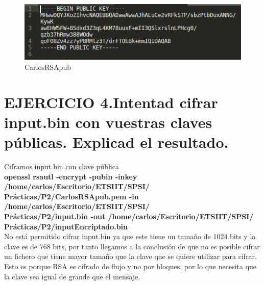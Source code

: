 \begin{figure}[H] %
	\centering
	\includegraphics[scale=0.55]{imagenes/CarlosRSApub} 
	\caption{CarlosRSApub} \label{etiq}
\end{figure}


\newpage










\section{EJERCICIO 4.Intentad cifrar input.bin con vuestras claves públicas. Explicad el resultado. }

Ciframos input.bin con clave pública \\
\textbf{openssl rsautl -encrypt -pubin -inkey /home/carlos/Escritorio/ETSIIT/SPSI/\\Prácticas/P2/CarlosRSApub.pem -in /home/carlos/Escritorio/ETSIIT/SPSI/\\Prácticas/P2/input.bin -out /home/carlos/Escritorio/ETSIIT/SPSI/\\Prácticas/P2/inputEncriptado.bin} \\

No está permitido cifrar input.bin ya que este tiene un tamaño de 1024 bits y la clave es de 768 bits, por tanto llegamos a la conclusión
de que no es posible cifrar un fichero que tiene mayor tamaño que la clave que se quiere utilizar para cifrar.
Esto es porque RSA es cifrado de flujo y no por bloques, por lo que necesita que la clave sea igual de grande que el mensaje.



